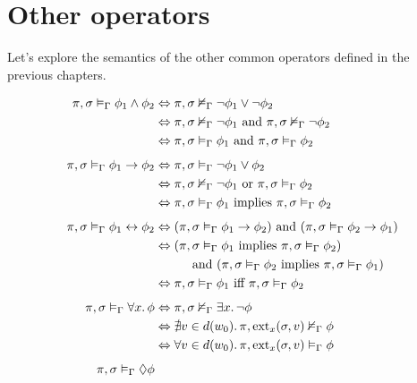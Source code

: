 \section{Other operators}
Let's explore the semantics of the other common operators defined in the previous chapters.

\begin{align}
  \sem{\pi}{\sigma}{\Gamma}{\phi_1 \land \phi_2}
    &\Leftrightarrow \semn{\pi}{\sigma}{\Gamma}{\neg\phi_1 \lor \neg\phi_2} \notag \\
    &\Leftrightarrow \semn{\pi}{\sigma}{\Gamma}{\neg\phi_1} \text{ and } \semn{\pi}{\sigma}{\Gamma}{\neg\phi_2} \notag \\
    &\Leftrightarrow \sem{\pi}{\sigma}{\Gamma}{\phi_1} \text{ and } \sem{\pi}{\sigma}{\Gamma}{\phi_2} \label{eq:andsem} \\[1ex]
  \sem{\pi}{\sigma}{\Gamma}{\phi_1 \to \phi_2}
    &\Leftrightarrow \sem{\pi}{\sigma}{\Gamma}{\neg\phi_1 \lor \phi_2} \notag \\
    &\Leftrightarrow \semn{\pi}{\sigma}{\Gamma}{\neg\phi_1} \text{ or } \sem{\pi}{\sigma}{\Gamma}{\phi_2} \notag \\
    &\Leftrightarrow \sem{\pi}{\sigma}{\Gamma}{\phi_1} \text{ implies } \sem{\pi}{\sigma}{\Gamma}{\phi_2} \label{eq:impliessem} \\[1ex]
  \sem{\pi}{\sigma}{\Gamma}{\phi_1 \leftrightarrow \phi_2}
    &\Leftrightarrow (\sem{\pi}{\sigma}{\Gamma}{\phi_1 \to \phi_2}) \text{ and } (\sem{\pi}{\sigma}{\Gamma}{\phi_2 \to \phi_1}) \notag \\
    &\Leftrightarrow (\sem{\pi}{\sigma}{\Gamma}{\phi_1} \text{ implies } \sem{\pi}{\sigma}{\Gamma}{\phi_2}) \notag \\
        &\qquad\quad\text{and } (\sem{\pi}{\sigma}{\Gamma}{\phi_2} \text{ implies } \sem{\pi}{\sigma}{\Gamma}{\phi_1}) \notag \\
    &\Leftrightarrow \sem{\pi}{\sigma}{\Gamma}{\phi_1} \text{ iff } \sem{\pi}{\sigma}{\Gamma}{\phi_2} \label{eq:iffsem} \\[1ex]
  \sem{\pi}{\sigma}{\Gamma}{\foralls{x}{\phi}}
    &\Leftrightarrow \semn{\pi}{\sigma}{\Gamma}{\existss{x}{\neg\phi}} \notag \\
    &\Leftrightarrow \nexists v \in d(w_0) \ldotp \semn{\pi}{\extend_x(\sigma, v)}{\Gamma}{\phi} \notag \\
    &\Leftrightarrow \foralls{v \in d(w_0)}{\sem{\pi}{\extend_x(\sigma, v)}{\Gamma}{\phi}} \label{eq:forallsem} \\[1ex]
  \sem{\pi}{\sigma}{\Gamma}{\eventually{\phi}}

\end{align}
